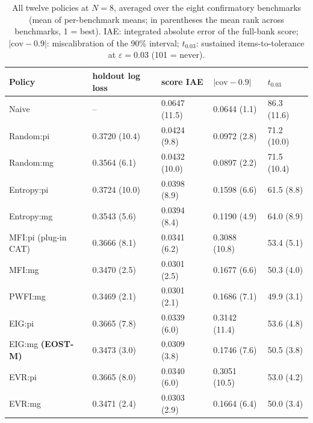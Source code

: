 \begin{table}[tbp]
\centering\footnotesize
\caption{All twelve policies at $N=8$, averaged over the eight confirmatory benchmarks (mean of per-benchmark means; in parentheses the mean rank across benchmarks, 1 = best). IAE: integrated absolute error of the full-bank score; $|\mathrm{cov}-0.9|$: miscalibration of the 90\% interval; $t_{0.03}$: sustained items-to-tolerance at $\varepsilon=0.03$ (101 = never).}
\label{tab:policies}
\setlength{\tabcolsep}{4pt}
\begin{tabular}{@{}lllll@{}}
\toprule
Policy & holdout log loss & score IAE & $|\mathrm{cov}-0.9|$ & $t_{0.03}$ \\
\midrule
Naive & -- & 0.0647 (11.5) & 0.0644 (1.1) & 86.3 (11.6) \\
Random:pi & 0.3720 (10.4) & 0.0424 (9.8) & 0.0972 (2.8) & 71.2 (10.0) \\
Random:mg & 0.3564 (6.1) & 0.0432 (10.0) & 0.0897 (2.2) & 71.5 (10.4) \\
Entropy:pi & 0.3724 (10.0) & 0.0398 (8.9) & 0.1598 (6.6) & 61.5 (8.8) \\
Entropy:mg & 0.3543 (5.6) & 0.0394 (8.4) & 0.1190 (4.9) & 64.0 (8.9) \\
MFI:pi (plug-in CAT) & 0.3666 (8.1) & 0.0341 (6.2) & 0.3088 (10.8) & 53.4 (5.1) \\
MFI:mg & 0.3470 (2.5) & 0.0301 (2.5) & 0.1677 (6.6) & 50.3 (4.0) \\
PWFI:mg & 0.3469 (2.1) & 0.0301 (2.1) & 0.1686 (7.1) & 49.9 (3.1) \\
EIG:pi & 0.3665 (7.8) & 0.0339 (6.0) & 0.3142 (11.4) & 53.6 (4.8) \\
EIG:mg \textbf{(EOST-M)} & 0.3473 (3.0) & 0.0309 (3.8) & 0.1746 (7.6) & 50.5 (3.8) \\
EVR:pi & 0.3665 (8.0) & 0.0340 (6.0) & 0.3051 (10.5) & 53.0 (4.2) \\
EVR:mg & 0.3471 (2.4) & 0.0303 (2.9) & 0.1664 (6.4) & 50.0 (3.4) \\
\bottomrule
\end{tabular}
\end{table}
